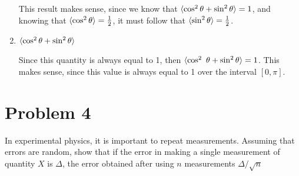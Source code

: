 \documentclass{article}
\begin{document}
\begin{enumerate}[label=(\alph*)]
\begin{solution}
        This result makes sense, since we know that $\langle \cos^2\theta + \sin^2\theta \rangle= 1$, and knowing that $\langle \cos^2\theta \rangle = \frac{1}{2}$, it must follow that $\langle \sin^2\theta \rangle = \frac{1}{2}$.
    \end{solution}


    \item $\langle \cos^2 \theta + \sin^2 \theta \rangle$

    \begin{solution}
    Since this quantity is always equal to 1, then $\langle \cos^2\ \theta + \sin^2 \theta \rangle = 1$. This makes sense, since this value is always equal to 1 over the interval $[0, \pi]$.

    \end{solution}
\end{enumerate}


\pagebreak
\section*{Problem 4}

In experimental physics, it is important to repeat measurements. Assuming that errors are random, show that if the error in making a single measurement of quantity $X$ is $\Delta$, the error obtained after using $n$ measurements $\Delta/\sqrt{n}$
\end{document}
